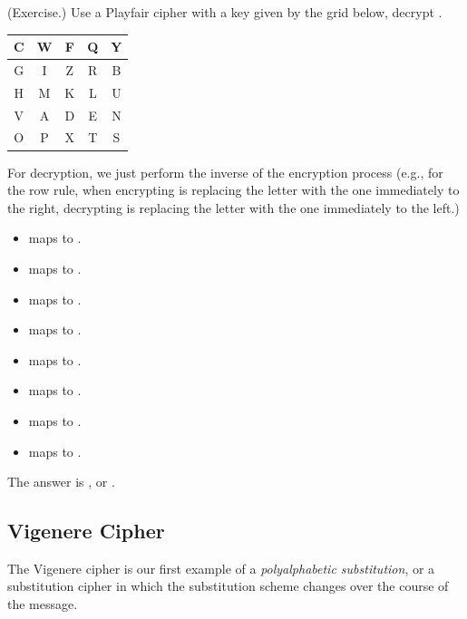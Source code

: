 \documentclass[letterpaper]{article}
\newcommand{\0}{\mathbf{0}}
\begin{document}
\begin{mdframed}
    (Exercise.) Use a Playfair cipher with a key given by the grid below, decrypt .
    \begin{center}
        \begin{tabular}{|c|c|c|c|c|}
            \hline
            C & W & F & Q & Y \\ 
            \hline
            G & I & Z & R & B \\ 
            \hline
            H & M & K & L & U \\ 
            \hline
            V & A & D & E & N \\ 
            \hline
            O & P & X & T & S \\ 
            \hline
        \end{tabular}
    \end{center}

    \begin{mdframed}
        For decryption, we just perform the inverse of the encryption process (e.g., for the row rule, when encrypting is replacing the letter with the one immediately to the right, decrypting is replacing the letter with the one immediately to the left.)
        \begin{itemize}
            \item {} maps to .
            \item {} maps to .
            \item {} maps to .
            \item {} maps to .
            \item {} maps to .
            \item {} maps to .
            \item {} maps to .
            \item {} maps to .
        \end{itemize}
        The answer is , or .
    \end{mdframed}
\end{mdframed}


\subsection{Vigenere Cipher}
The Vigenere cipher is our first example of a \emph{polyalphabetic substitution}, or a substitution cipher in which the substitution scheme changes over the course of the message.
\end{document}

